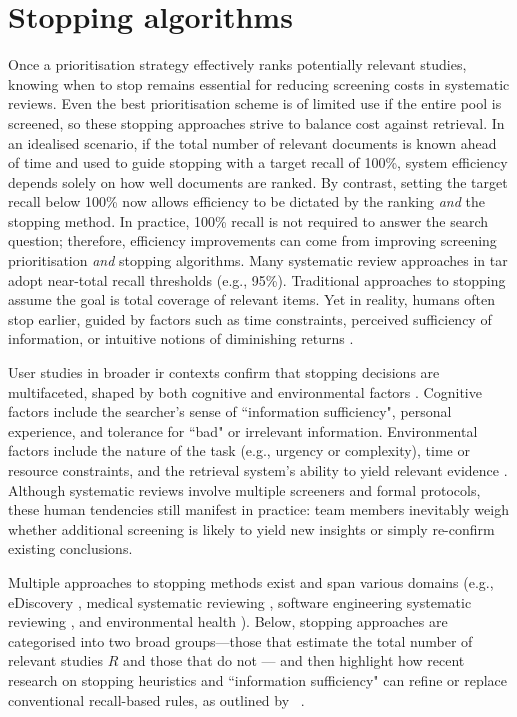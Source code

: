 \documentclass[10pt,oneside]{book}
\begin{document}
\section{Stopping algorithms}\label{sec:Stopping_algorithms}

Once a prioritisation strategy effectively ranks potentially relevant studies, knowing when to stop remains essential for reducing screening costs in systematic reviews. Even the best prioritisation scheme is of limited use if the entire pool is screened, so these stopping approaches strive to balance cost against retrieval. In an idealised scenario, if the total number of relevant documents is known ahead of time and used to guide stopping with a target recall of 100\%, system efficiency depends solely on how well documents are ranked. By contrast, setting the target recall below 100\% now allows efficiency to be dictated by the ranking \emph{and} the stopping method. In practice, 100\% recall is not required to answer the search question; therefore, efficiency improvements can come from improving screening prioritisation \emph{and} stopping algorithms. Many systematic review approaches in \gls*{tar} adopt near-total recall thresholds (e.g., 95\%). Traditional approaches to stopping assume the goal is total coverage of relevant items. Yet in reality, humans often stop earlier, guided by factors such as time constraints, perceived sufficiency of information, or intuitive notions of diminishing returns \cite{ilani_analysis_2024, browne_cognitive_2007, wu_online_2014}.

User studies in broader \gls*{ir} contexts confirm that stopping decisions are multifaceted, shaped by both cognitive and environmental factors \cite{ilani_analysis_2024}. Cognitive factors include the searcher’s sense of ``information sufficiency", personal experience, and tolerance for ``bad" or irrelevant information. Environmental factors include the nature of the task (e.g., urgency or complexity), time or resource constraints, and the retrieval system's ability to yield relevant evidence \cite{prabha_what_2007}. Although systematic reviews involve multiple screeners and formal protocols, these human tendencies still manifest in practice: team members inevitably weigh whether additional screening is likely to yield new insights or simply re-confirm existing conclusions.

Multiple approaches to stopping methods exist and span various domains (e.g., eDiscovery \cite{yang_heuristic_2021, yang_minimizing_2021}, medical systematic reviewing \cite{shemilt_pinpointing_2014}, software engineering systematic reviewing \cite{yu_fast2_2019}, and environmental health \cite{howard_swift-active_2020}). Below, stopping approaches are categorised into two broad groups—those that estimate the total number of relevant studies $R$ and those that do not — and then highlight how recent research on stopping heuristics and ``information sufficiency" can refine or replace conventional recall-based rules, as outlined by ~\cite{stevenson_stopping_2023}.
\end{document}
